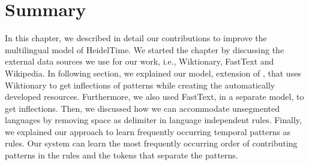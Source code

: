 



\section{Summary}
In this chapter, we described in detail our contributions to improve the multilingual model of HeidelTime. We started the chapter by discussing the external data sources we use for our work, i.e., Wiktionary, FastText and Wikipedia. In following section, we explained our model, extension of \cite{DBLP:conf/emnlp/StrotgenG15}, that uses Wiktionary to get inflections of patterns while creating the automatically developed resources. Furthermore, we also used FastText, in a separate model, to get inflections. Then, we discussed how we can accommodate unsegmented languages by removing space as delimiter in language independent rules. Finally, we explained our approach to learn frequently occurring temporal patterns as rules. Our system can learn the most frequently occurring order of contributing patterns in the rules and the tokens that separate the patterns.